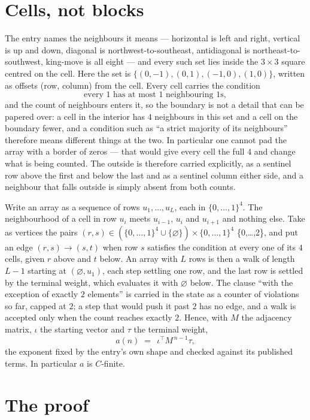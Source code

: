 \documentclass[11pt,a4paper]{article}
\theoremstyle{plain}
\theoremstyle{definition}
\begin{document}
\section{Cells, not blocks}

The entry names the neighbours it means --- horizontal is left and right, vertical is up and
down, diagonal is northwest-to-southeast, antidiagonal is northeast-to-southwest, king-move is
all eight --- and every such set lies inside the $3\times3$ square centred on the cell. Here
the set is $\{(0,-1), (0,1), (-1,0), (1,0)\}$, written as offsets (row, column) from the cell. Every cell carries
the condition
\[
\text{every 1 has at most 1 neighbouring 1s},
\]
and the count of neighbours enters it, so the boundary is not a detail that can be papered
over: a cell in the interior has $4$ neighbours in this set and a cell on the boundary
fewer, and a condition such as ``a strict majority of its neighbours'' therefore means
different things at the two. In particular one cannot pad the array with a border of zeros ---
that would give every cell the full $4$ and change what is being counted. The outside is
therefore carried
explicitly, as a sentinel row above the first and below the last and as a sentinel column
either side, and a neighbour that falls outside is simply absent from both counts.

Write an array as a sequence of rows $u_1,\dots,u_L$, each in
$\{0,\dots,1\}^{4}$. The neighbourhood of a cell in row $u_i$ meets $u_{i-1}$,
$u_i$ and $u_{i+1}$ and nothing else. Take as vertices the pairs
$(r,s)\in(\{0,\dots,1\}^{4}\cup\{\varnothing\})\times\{0,\dots,1\}^{4}$ \times \{0,\dots,2\},
and put an edge $(r,s)\to(s,t)$ when row $s$ satisfies the condition at every one of its
$4$ cells, given $r$ above and $t$ below. An array with $L$ rows is then a walk of length
$L-1$ starting at $(\varnothing,u_1)$, each step settling one row, and the last row is
settled by the terminal weight, which evaluates it with $\varnothing$ below. The clause ``with the exception of exactly $2$ elements'' is carried in
the state as a counter of violations so far, capped at $2$; a step that would push it past
$2$ has no edge, and a walk is accepted only when the count reaches exactly $2$. Hence,
with $M$ the adjacency matrix, $\iota$ the starting vector and $\tau$ the terminal weight,
\[
a(n)\;=\;\,\iota^{\!\top}M^{\,n-1}\tau ,
\]
the exponent fixed by the entry's own shape and checked against its published terms. In
particular $a$ is $C$-finite.

\section{The proof}
\end{document}
